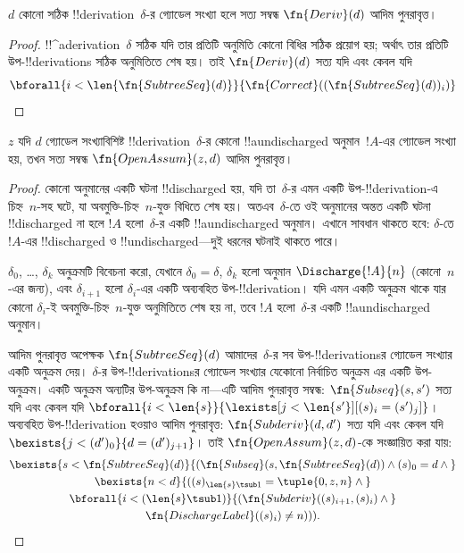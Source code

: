 \documentclass[../../../include/open-logic-section]{subfiles}
\begin{document}
\begin{prop}
  $d$ কোনো সঠিক !!{derivation}~$\delta$-র গ্যোডেল সংখ্যা হলে সত্য সম্বন্ধ
  $\fn{Deriv}(d)$ আদিম পুনরাবৃত্ত।
\end{prop}

\begin{proof}
  !!^a{derivation}~$\delta$ সঠিক যদি তার প্রতিটি অনুমিতি কোনো বিধির সঠিক
  প্রয়োগ হয়; অর্থাৎ তার প্রতিটি উপ-!!{derivation}s সঠিক অনুমিতিতে শেষ হয়।
  তাই $\fn{Deriv}(d)$ সত্য যদি এবং কেবল যদি
  \[
  \bforall{i<\len{\fn{SubtreeSeq}(d)}}{\fn{Correct}((\fn{SubtreeSeq}(d))_i)}
  \]
\end{proof}

\begin{prop}
   $z$ যদি $d$ গ্যোডেল সংখ্যাবিশিষ্ট
  !!{derivation}~$\delta$-র কোনো !!a{undischarged} অনুমান~$!A$-এর গ্যোডেল
  সংখ্যা হয়, তখন সত্য সম্বন্ধ $\fn{OpenAssum}(z, d)$ আদিম পুনরাবৃত্ত।
\end{prop}

\begin{proof}
  কোনো অনুমানের একটি ঘটনা !!{discharged} হয়, যদি তা~$\delta$-র এমন একটি
  উপ-!!{derivation}-এ চিহ্ন~$n$-সহ ঘটে, যা অবমুক্তি-চিহ্ন~$n$-যুক্ত বিধিতে
  শেষ হয়। অতএব~$\delta$-তে ওই অনুমানের অন্তত একটি ঘটনা !!{discharged} না হলে
  $!A$ হলো~$\delta$-র একটি !!a{undischarged} অনুমান। এখানে সাবধান থাকতে হবে:
  $\delta$-তে $!A$-এর !!{discharged} ও !!{undischarged}—দুই ধরনের ঘটনাই
  থাকতে পারে।

  $\delta_0$, \dots, $\delta_k$ অনুক্রমটি বিবেচনা করো, যেখানে
  $\delta_0 = \delta$, $\delta_k$ হলো অনুমান $\Discharge{!A}{n}$
  (কোনো~$n$-এর জন্য), এবং $\delta_{i+1}$ হলো $\delta_i$-এর একটি অব্যবহিত
  উপ-!!{derivation}। যদি এমন একটি অনুক্রম থাকে যার কোনো $\delta_i$-ই
  অবমুক্তি-চিহ্ন~$n$-যুক্ত অনুমিতিতে শেষ হয় না, তবে $!A$ হলো~$\delta$-র
  একটি !!a{undischarged} অনুমান।

  আদিম পুনরাবৃত্ত অপেক্ষক $\fn{SubtreeSeq}(d)$ আমাদের~$\delta$-র সব
  উপ-!!{derivation}sর গ্যোডেল সংখ্যার একটি অনুক্রম দেয়। $\delta$-র
  উপ-!!{derivation}sর গ্যোডেল সংখ্যার যেকোনো নির্বাচিত অনুক্রম এর একটি
  উপ-অনুক্রম। একটি অনুক্রম অন্যটির উপ-অনুক্রম কি না—এটি আদিম পুনরাবৃত্ত
  সম্বন্ধ: $\fn{Subseq}(s, s')$ সত্য যদি এবং কেবল যদি
  $\bforall{i<\len{s}}{\lexists[j<\len{s'}][(s)_i = (s')_j]}$। অব্যবহিত
  উপ-!!{derivation} হওয়াও আদিম পুনরাবৃত্ত: $\fn{Subderiv}(d, d')$ সত্য যদি
  এবং কেবল যদি $\bexists{j<(d')_0}{d = (d')_{j+1}}$। তাই
  $\fn{OpenAssum}(z, d)$-কে সংজ্ঞায়িত করা যায়:
  \begin{multline*}
    \bexists{s<\fn{SubtreeSeq}(d)}{(\fn{Subseq}(s, \fn{SubtreeSeq}(d))
      \land (s)_0 = d \land {}} \\
    \bexists{n<d}{((s)_{\len{s} \tsub 1} = \tuple{0, z, n} \land {}}\\
      \bforall{i<(\len{s} \tsub 1)}{(\fn{Subderiv}((s)_{i+1}, (s)_i) \land {}}\\
      \fn{DischargeLabel}((s)_i) \neq n))).
  \end{multline*}
\end{proof}
\end{document}
